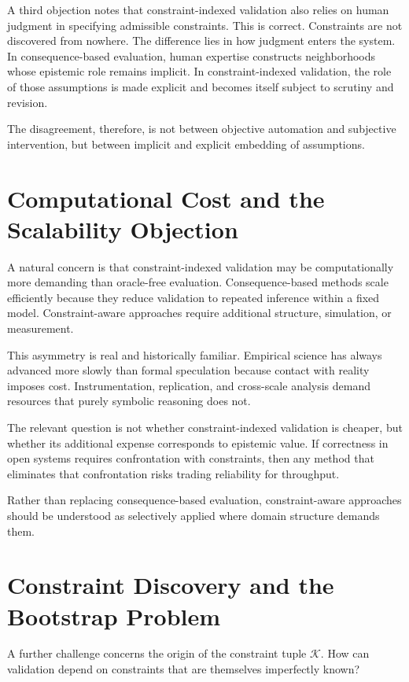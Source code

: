 \documentclass[11pt]{article}
\begin{document}
A third objection notes that constraint-indexed validation also relies on human judgment in specifying admissible constraints. This is correct. Constraints are not discovered from nowhere. The difference lies in how judgment enters the system. In consequence-based evaluation, human expertise constructs neighborhoods whose epistemic role remains implicit. In constraint-indexed validation, the role of those assumptions is made explicit and becomes itself subject to scrutiny and revision.

The disagreement, therefore, is not between objective automation and subjective intervention, but between implicit and explicit embedding of assumptions.

\section{Computational Cost and the Scalability Objection}

A natural concern is that constraint-indexed validation may be computationally more demanding than oracle-free evaluation. Consequence-based methods scale efficiently because they reduce validation to repeated inference within a fixed model. Constraint-aware approaches require additional structure, simulation, or measurement.

This asymmetry is real and historically familiar. Empirical science has always advanced more slowly than formal speculation because contact with reality imposes cost. Instrumentation, replication, and cross-scale analysis demand resources that purely symbolic reasoning does not.

The relevant question is not whether constraint-indexed validation is cheaper, but whether its additional expense corresponds to epistemic value. If correctness in open systems requires confrontation with constraints, then any method that eliminates that confrontation risks trading reliability for throughput.

Rather than replacing consequence-based evaluation, constraint-aware approaches should be understood as selectively applied where domain structure demands them.

\section{Constraint Discovery and the Bootstrap Problem}

A further challenge concerns the origin of the constraint tuple \(\mathcal{K}\). How can validation depend on constraints that are themselves imperfectly known?
\end{document}
